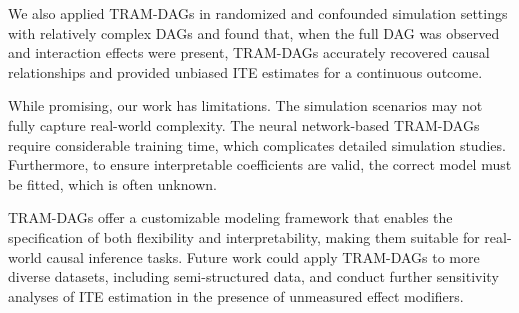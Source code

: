 \documentclass[11pt,a4paper,twoside]{book}
\begin{document}
We also applied TRAM-DAGs in randomized and confounded simulation settings with relatively complex DAGs and found that, when the full DAG was observed and interaction effects were present, TRAM-DAGs accurately recovered causal relationships and provided unbiased ITE estimates for a continuous outcome.

While promising, our work has limitations. The simulation scenarios may not fully capture real-world complexity. The neural network-based TRAM-DAGs require considerable training time, which complicates detailed simulation studies. Furthermore, to ensure interpretable coefficients are valid, the correct model must be fitted, which is often unknown.

TRAM-DAGs offer a customizable modeling framework that enables the specification of both flexibility and interpretability, making them suitable for real-world causal inference tasks. Future work could apply TRAM-DAGs to more diverse datasets, including semi-structured data, and conduct further sensitivity analyses of ITE estimation in the presence of unmeasured effect modifiers.


% 
% 
% 
\end{document}

